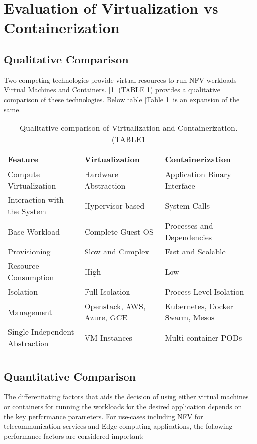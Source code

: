 \section{Evaluation of Virtualization vs Containerization}

\subsection{Qualitative Comparison}
	
\begin{flushleft}
Two competing technologies provide virtual resources to run NFV workloads – Virtual Machines and Containers. [1] (TABLE 1) provides a qualitative comparison of these technologies. Below table [Table 1] is an expansion of the same.

\begin{longtable}[t!]{|p{4cm}|p{4cm}|p{4cm}|}
	
\hline\hline
\textbf{Feature} & \textbf{Virtualization} & \textbf{Containerization} \\
\hline\hline
\hline
Compute Virtualization & Hardware Abstraction & Application Binary Interface \\
\hline
Interaction with the System & Hypervisor-based & System Calls \\
\hline
Base Workload & Complete Guest OS & Processes and Dependencies \\
\hline
Provisioning & Slow and Complex & Fast and Scalable \\
\hline
Resource Consumption & High & Low \\
\hline
Isolation & Full Isolation & Process-Level Isolation \\
\hline
Management & Openstack, AWS, Azure, GCE & Kubernetes, Docker Swarm, Mesos \\
\hline
Single Independent Abstraction & VM Instances & Multi-container PODs \\
\hline\hline
\label{tab:tab3}
\caption{Qualitative comparison of Virtualization and Containerization. (TABLE1 \cite[p.1663]{taleb17}}
\end{longtable}
	
\end{flushleft}

\subsection{Quantitative Comparison}

\begin{flushleft}
The differentiating factors that aids the decision of using either virtual machines or containers for running the workloads for the desired application depends on the key performance parameters. For use-cases including NFV for telecommunication services and Edge computing applications, the following performance factors are considered important:
\end{flushleft}


